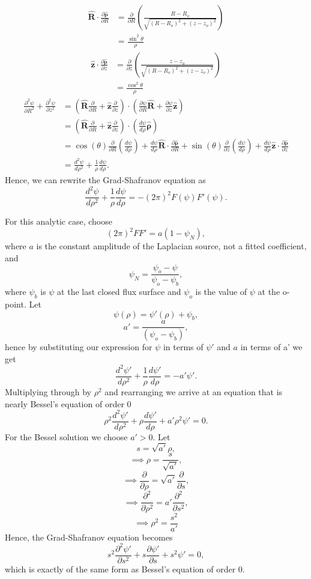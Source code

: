 \documentclass{article}
\begin{document}
\[\begin{aligned}
\mathbf{\hat{R}}\cdot\frac{\partial \mathbf{\hat{\rho}}}{\partial R} &= \frac{\partial}{\partial R}\left(\frac{R-R_o}{\sqrt{(R-R_o)^2+(z-z_o)^2}}\right)\\
&= \frac{\sin^2\theta}{\rho}
\end{aligned}\]
\[\begin{aligned}
\mathbf{\hat{z}}\cdot\frac{\partial \mathbf{\hat{\rho}}}{\partial z} &= \frac{\partial}{\partial z}\left(\frac{z-z_o}{\sqrt{(R-R_o)^2+(z-z_o)^2}}\right)\\
&= \frac{\cos^2\theta}{\rho}
\end{aligned}\]
\[\begin{aligned}
\frac{\partial^2\psi}{\partial R^2} + \frac{\partial^2 \psi}{\partial z^2} &= \left(\mathbf{\hat{R}}\frac{\partial }{\partial R} + \mathbf{\hat{z}}\frac{\partial }{\partial z}\right)
\cdot\left(\frac{\partial \psi}{\partial R}\mathbf{\hat{R}} + \frac{\partial \psi}{\partial z}\mathbf{\hat{z}}\right) \\ 
&= \left(\mathbf{\hat{R}}\frac{\partial }{\partial R} + \mathbf{\hat{z}}\frac{\partial }{\partial z}\right) \cdot \left(\frac{d \psi}{d \rho}\mathbf{\hat{\rho}}\right) \\
&= \cos(\theta)\frac{\partial}{\partial R}\left(\frac{d \psi}{d \rho}\right)
+ \frac{d \psi}{d \rho}\mathbf{\hat{R}}\cdot\frac{\partial \mathbf{\hat{\rho}}}{\partial R}
+ \sin(\theta)\frac{\partial}{\partial z}\left(\frac{d \psi}{d \rho}\right)
+ \frac{d \psi}{d \rho}\mathbf{\hat{z}}\cdot\frac{\partial \mathbf{\hat{\rho}}}{\partial z} \\
&= \frac{d^2\psi}{d \rho^2} + \frac{1}{\rho}\frac{d \psi}{d \rho}.
\end{aligned}\]
Hence,
we can rewrite the Grad-Shafranov equation as
\[\frac{d^2\psi}{d \rho^2} + \frac{1}{\rho}\frac{d \psi}{d \rho} = -(2\pi)^2F(\psi)F'(\psi).\]

For this analytic case, choose
\[(2\pi)^2FF' = a(1-\psi_N),\]
where $a$ is the constant amplitude of the Laplacian source, not a fitted coefficient, and
\[\psi_N = \frac{\psi_o-\psi}{\psi_o-\psi_b},\]
where $\psi_b$ is $\psi$ at the last closed flux surface and $\psi_o$ is the value of $\psi$ at the o-point.
Let
\[\psi(\rho)=\psi'(\rho)+\psi_b,\]
\[a'=\frac{a}{(\psi_o - \psi_b)},\]
hence by substituting our expression for $\psi$ in terms of $\psi'$ and $a$ in terms of a' we get
\[\frac{d^2\psi'}{d \rho^2} + \frac{1}{\rho}\frac{d \psi'}{d \rho} = -a'\psi'.\]
Multiplying through by $\rho^2$ and rearranging we arrive at an equation that is nearly Bessel's equation of order 0
\[\rho^2\frac{d^2\psi'}{d \rho^2} + \rho\frac{d \psi'}{d \rho} + a'\rho^2\psi'= 0.\]
For the Bessel solution we choose $a'>0$. Let
\[s=\sqrt{a'}\rho,\]
\[\implies \rho=\frac{s}{\sqrt{a'}},\]
\[\implies \frac{\partial }{\partial \rho} =\sqrt{a'}\frac{\partial }{\partial s},\]
\[\implies \frac{\partial^2 }{\partial \rho^2} =a'\frac{\partial^2 }{\partial s^2},\]
\[\implies \rho^2 = \frac{s^2}{a'}\]
Hence, the Grad-Shafranov equation becomes
\[s^2\frac{\partial^2\psi'}{\partial s^2} + s\frac{\partial \psi'}{\partial s} + s^2\psi'= 0,\]
which is exactly of the same form as Bessel's equation of order 0.
\end{document}
